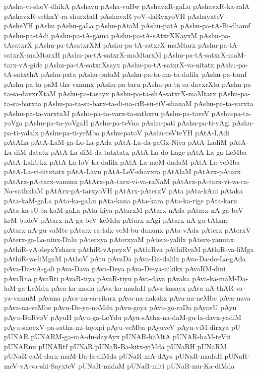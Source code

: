 {pAsha-vi-shoV-dhikA
pAshavu
pAsha-vuBw
pAshavxR-gaLu
pAshavxR-ka-ralA
pAshavxR-sethxY-ra-shurxtaH
pAshavxR-yoV-daRvxyoVH
pAshayxteV
pAsheYH
pAshu
pAshu-gaLa
pAshu-pAtaM
pAshu-patA
pAshu-pa-tA-Bi-dhamf
pAshu-pa-tAdi
pAshu-pa-tA-gama
pAshu-pa-tA-sAtxrXKayxM
pAshu-pa-tAsatxrX
pAshu-pa-tAsatxrXM
pAshu-pa-tA-satxrX-maMtarx
pAshu-pa-tA-satxrX-maMtarxH
pAshu-pa-tA-satxrX-maMtarxM
pAshu-pa-tA-satxrX-maM-tarx-vA-gide
pAshu-pa-tA-satxrXsayx
pAshu-pa-tA-satxrX-va-nitatx
pAshu-pa-tA-satxthA
pAshu-pata
pAshu-pataM
pAshu-pa-ta-ma-ta-dalilx
pAshu-pa-tamf
pAshu-pa-ta-paM-tha-vanunx
pAshu-pa-taru
pAshu-pa-ta-sa-davxrXta
pAshu-pa-ta-sa-davxrXtaM
pAshu-pa-tasayx
pAshu-pa-ta-shA-satxrX-maMtarx
pAshu-pa-ta-su-barxta
pAshu-pa-ta-su-barx-ta-di-na-ciR-su-tiV-shanaM
pAshu-pa-ta-varxta
pAshu-pa-ta-varxtaM
pAshu-pa-ta-varx-ta-sathxru
pAshu-pa-taveV
pAshu-pa-ta-yoVga
pAshu-pa-ta-yoVgaH
pAshu-pa-teVna
pAshu-pati
pAshu-pa-ti-yAgi
pAshu-pa-ti-yalalx
pAshu-pa-ti-yeMba
pAshu-patoV
pAshu-reVteYH
pAtA-LAdi
pAtALa
pAtA-LaM-ga-Lo-La-gAda
pAtA-La-da-gaGx-Niya
pAtA-LadiM
pAtA-La-diM-datatx
pAtA-La-diM-da-tatxtatx
pAtA-La-do-Lage
pAtA-La-ga-LeMba
pAtA-LakUkx
pAtA-La-loV-ka-dalilx
pAtA-La-meM-dadaM
pAtA-La-veMba
pAtA-La-vi-titxtatx
pAtA-Lavu
pAtA-LeV-shavxra
pAtAlaM
pAtArx-pAtarx
pAtArx-pA-tarx-vanunx
pAtArx-pA-tarx-vi-va-raNaM
pAtArx-pA-tarx-vi-va-ra-Na-sathxlaM
pAtArx-pA-tarxyoVH
pAtArx-pAterxV
pAta
pAta-kAni
pAtaka
pAta-kaM-gaLa
pAta-ka-gaLu
pAta-kana
pAta-kara
pAta-ka-rige
pAta-karu
pAta-ka-sU-ta-kaM-gaLa
pAta-kiya
pAtarxM
pAtarx-nAda
pAtarx-nA-ga-beV-keM-budeV
pAtarx-nA-ga-beV-keMdu
pAtarx-nAgi
pAtarx-nA-gu-tAtxne
pAtarx-nA-gu-vaMte
pAtarx-ra-lalx-veM-bu-danunx
pAta-vAda
pAterx
pAterxV
pAterx-ga-La-ninx-Dalu
pAterxya
pAterxyaM
pAterx-yalilx
pAterx-yanunx
pAthiR-vA-deyxYshacx
pAthiR-vApeyxV
pAthiRva
pAthiRvaM
pAthiR-va-liMga
pAthiR-va-liMgaM
pAthoV
pAtu
pAvaDa
pAva-Da-dalilx
pAva-Da-do-La-gAda
pAva-Da-vA-gali
pAva-Dava
pAva-Deya
pAva-De-ya-nikikx
pAvaRM-dini
pAvaRna
pAvaRti
pAvaR-tiya
pAvaR-tiyu
pAva-dava
pAvaka
pAva-ka-maM-Da-laM-ga-LeMdu
pAva-ka-mada
pAva-ka-madaH
pAva-kasayx
pAva-nA-thAR-va-ya-vamuM
pAvana
pAva-na-ca-ritarx
pAva-na-nakakx
pAva-na-neMbe
pAva-nava
pAva-na-veMbe
pAvu-De-ya-noMdu
pAvu-geya
pAvu-go-raDa
pAyavU
pAyu
pAyu-BuRvoV
pAyuH
pAyu-ga-LeYdu
pAyu-sAthx-na-daM-gu-la-davx-yadiM
pAyu-shocxV-pa-sathx-mi-tayxpi
pAyu-veMba
pAyuveV
pAyu-viM-dirxya
pU
pUNAR
pUNARM-ga-mA-du-dayAyx
pUNAR-haMtA
pUNAR-haM-teVti
pUNARnu
pUNARtf
pUNaR
pUNaR-Ba-kitx-yiMda
pUNaRH
pUNaRM
pUNaR-caM-darx-maM-Da-la-diMda
pUNaR-mA-dAya
pUNaR-madaH
pUNaR-meV-vA-va-shi-SayxteV
pUNaR-midaM
pUNaR-miti
pUNaR-mu-Ka-diMda
}
